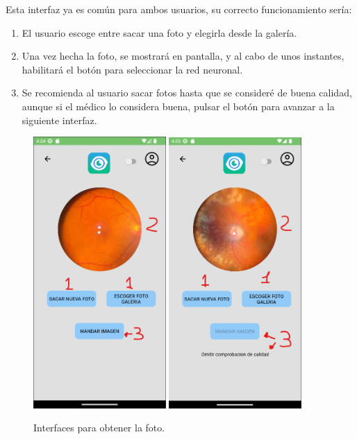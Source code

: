 Esta interfaz ya es común para ambos usuarios, su correcto funcionamiento sería:
\begin{enumerate}
    \def\labelenumi{\arabic{enumi}.}
    \tightlist
    \item El usuario escoge entre sacar una foto y elegirla desde la galería.
    \item Una vez hecha la foto, se mostrará en pantalla, y al cabo de unos instantes, habilitará el botón para seleccionar la red neuronal.
    \item Se recomienda al usuario sacar fotos hasta que se consideré de buena calidad, aunque si el médico lo considera buena, pulsar el botón para avanzar a la siguiente interfaz.
\end{enumerate}
\begin{figure}[!ht]
         \centering
         \includegraphics[width=0.45\textwidth]{img/Interfaz FotoApta.png}
         \includegraphics[width=0.45\textwidth]{img/Interfaz FotoNoapta.png}
         \caption{Interfaces para obtener la foto.}
         \label{fig:InterfazFoto}
\end{figure}
